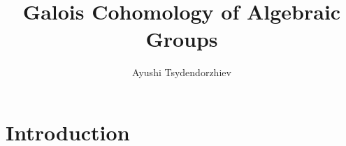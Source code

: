 
\title{Galois Cohomology of Algebraic Groups}
\author[Ayushi Tsydendorzhiev]{Ayushi Tsydendorzhiev}
\usepackage{enumitem}
\usepackage{stmaryrd}
\usepackage{xhfill}
\usepackage{array}
\usepackage{outlines}
\usepackage{faktor}
\usepackage{float}
\usepackage{mathtools}
\usepackage{tikz-cd}
\usepackage{centernot}
\usepackage{cancel}
\newcommand{\ra}{\rightarrow}
\newcommand{\lra}{\longrightarrow}
\newcommand{\eps}{\varepsilon}
\renewcommand{\P}{\mathbb{P}}
\newcommand{\acts}{\curvearrowright}
\newcommand\Gal[1]{\operatorname{Gal}({#1})}
\renewcommand{\phi}{\varphi}
\newcommand\discr[1]{\operatorname{discr}({#1})}



\maketitle

\tableofcontents
\clearpage

\section{Introduction}

